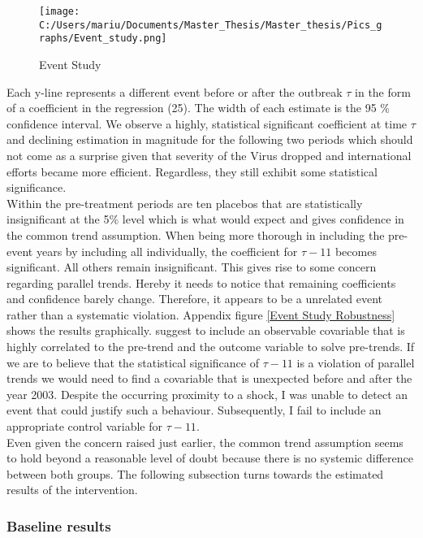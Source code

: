 \documentclass{article}
\begin{document}
\begin{figure}[!ht]
\begin{center}\caption{Event Study \label{Event Study}}
\texttt{[image: C:/Users/mariu/Documents/Master\_Thesis/Master\_thesis/Pics\_graphs/Event\_study.png]}\\
\end{center}
\end{figure}

Each y-line represents a different event before or after the outbreak $\tau$ in the form of a coefficient in the regression (25). The width of each estimate is the 95 \% confidence interval. We observe a highly, statistical significant coefficient at time $\tau$ and declining estimation in magnitude for the following two periods which should not come as a surprise given that severity of the Virus dropped and international efforts became more efficient. Regardless, they still exhibit some statistical significance.\\
Within the pre-treatment periods are ten placebos that are statistically insignificant at the 5\% level which is what would expect and gives confidence in the common trend assumption. When being more thorough in including the pre-event years by including all individually, the coefficient for $\tau - 11$ becomes significant. All others remain insignificant. This gives rise to some concern regarding parallel trends. Hereby it needs to notice that remaining coefficients and confidence barely change. Therefore, it appears to be a unrelated event rather than a systematic violation. Appendix figure \ref{Event Study Robustness} shows the results graphically. \cite{freyal2018pre} suggest to include an observable covariable that is highly correlated to the pre-trend and the outcome variable to solve pre-trends. If we are to believe that the statistical significance of $\tau - 11$ is a violation of parallel trends we would need to find a covariable that is unexpected before and after the year 2003. Despite the occurring proximity to a shock, I was unable to detect an event that could justify such a behaviour. Subsequently, I fail to include an appropriate control variable for $\tau - 11$.\\
Even given the concern raised just earlier, the common trend assumption seems to hold beyond a reasonable level of doubt because there is no systemic difference between both groups. The following subsection turns towards the estimated results of the intervention.

\subsubsection{Baseline results}
\end{document}
